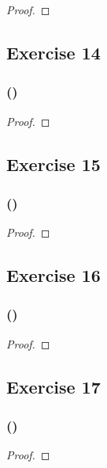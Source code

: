\documentclass[14pt]{extarticle}
\begin{document}
\begin{proof}

\end{proof}

\subsection{Exercise 14}

\subsubsection{()}

\begin{proof}

\end{proof}

\subsection{Exercise 15}

\subsubsection{()}

\begin{proof}

\end{proof}

\subsection{Exercise 16}

\subsubsection{()}

\begin{proof}

\end{proof}

\subsection{Exercise 17}

\subsubsection{()}

\begin{proof}

\end{proof}
\end{document}
